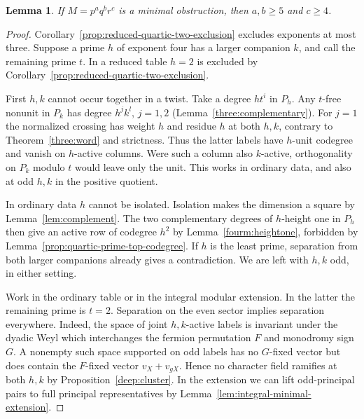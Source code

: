 \documentclass[11pt,a4paper]{article}
\numberwithin{equation}{section}
\newtheorem{lemma}[theorem]{Lemma}
\theoremstyle{remark}
\begin{document}
\begin{lemma}\label{short:quartic}
If $M=p^a q^b r^c$ is a minimal obstruction, then
$a,b\ge5$ and $c\ge4$.
\end{lemma}
\begin{proof}
Corollary~\ref{prop:reduced-quartic-two-exclusion} excludes exponents at most three.
Suppose a prime $h$ of exponent four has a larger companion $k$,
and call the remaining prime $t$. In a reduced table
$h=2$ is excluded by Corollary~\ref{prop:reduced-quartic-two-exclusion}.

First $h,k$ cannot occur together in a twist. Take a degree $ht^i$ in
$P_h$. Any $t$-free nonunit in $P_k$ has degree $h^j k^l$, $j=1,2$
(Lemma~\ref{three:complementary}). For $j=1$ the normalized crossing
has weight $h$ and residue $h$ at both $h,k$, contrary to
Theorem~\ref{three:word} and strictness. Thus the latter labels have
$h$-unit codegree and vanish on $h$-active columns. Were such a column
also $k$-active, orthogonality on $P_k$ modulo $t$ would leave only the
unit. This works in ordinary data, and also at odd $h,k$ in the
positive quotient.

In ordinary data $h$ cannot be isolated. Isolation makes the dimension
a square by Lemma~\ref{lem:complement}. The two complementary
degrees of $h$-height one in $P_h$ then give an active row of codegree
$h^2$ by Lemma~\ref{fourm:heightone}, forbidden by
Lemma~\ref{prop:quartic-prime-top-codegree}. If $h$ is the least
prime, separation from both larger companions already gives a
contradiction. We are left with $h,k$ odd, in either setting.

Work in the ordinary table or in the integral modular extension.
In the latter the remaining prime is $t=2$. Separation on the even
sector implies separation everywhere. Indeed, the space of joint $h,k$-active
labels is invariant under the dyadic Weyl which interchanges the
fermion permutation $F$ and monodromy sign $G$. A nonempty such space
supported on odd labels has no $G$-fixed vector but does contain the
$F$-fixed vector $v_X+v_{gX}$. Hence no character field ramifies at
both $h,k$ by Proposition~\ref{deep:cluster}.
In the extension we can lift odd-principal pairs to full principal
representatives by Lemma~\ref{lem:integral-minimal-extension}.


\end{proof}
\end{document}
